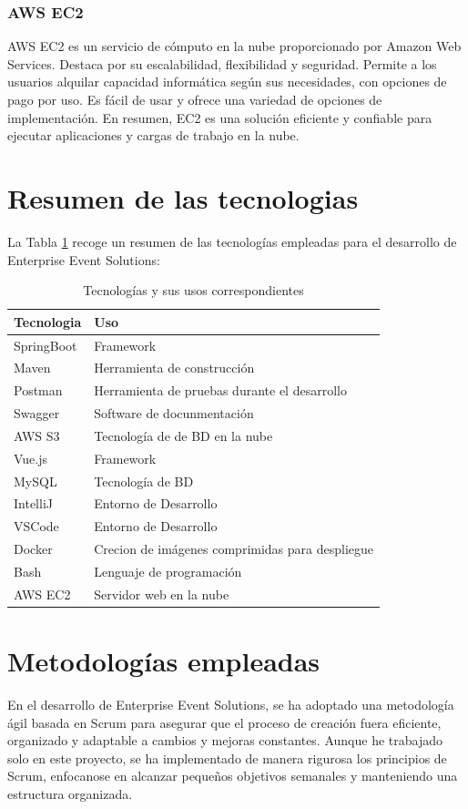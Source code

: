\subsubsection{AWS EC2}
AWS EC2 es un servicio de cómputo en la nube proporcionado por Amazon Web Services. Destaca por su escalabilidad, flexibilidad y seguridad.
Permite a los usuarios alquilar capacidad informática según sus necesidades, con opciones de pago por uso. Es fácil de usar y ofrece una variedad
de opciones de implementación. En resumen, EC2 es una solución eficiente y confiable para ejecutar aplicaciones y cargas de trabajo en la nube.

\section{Resumen de las tecnologias}
La Tabla \ref{tabla:tecnologias_usos} recoge un resumen de las tecnologías empleadas para el desarrollo de Enterprise Event Solutions:

\begin{table}[h]
\begin{tabular}{ p{3cm} l  }

    \hline
    Tecnologia& Uso \\
    \hline
    SpringBoot   & Framework \\
    Maven &   Herramienta de construcción \\
    Postman & Herramienta de pruebas durante el desarrollo \\
    Swagger & Software de docunmentación \\
    AWS S3& Tecnología de de BD en la nube  \\
    Vue.js & Framework  \\
    MySQL    & Tecnología de BD \\
    IntelliJ&   Entorno de Desarrollo  \\
    VSCode& Entorno de Desarrollo \\
    Docker& Crecion de imágenes comprimidas para despliegue  \\
    Bash& Lenguaje de programación \\
    AWS EC2& Servidor web en la nube  \\

    \hline
   \end{tabular}
   \caption{Tecnologías y sus usos correspondientes}
   \label{tabla:tecnologias_usos}
\end{table}


\section{Metodologías empleadas}
En el desarrollo de Enterprise Event Solutions, se ha adoptado una metodología ágil basada en Scrum para asegurar que el proceso de creación 
fuera eficiente, organizado y adaptable a cambios y mejoras constantes. Aunque he trabajado solo en este proyecto, se ha implementado de manera 
rigurosa los principios de Scrum, enfocanose en alcanzar pequeños objetivos semanales y manteniendo una estructura organizada.

